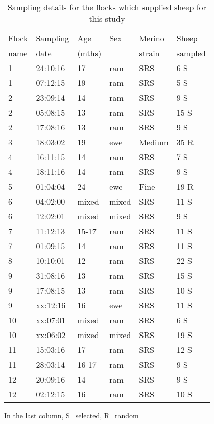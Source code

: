 %

\begin{table}[htp]
\centering
\caption{Sampling details for the flocks which supplied sheep for this study}
\label{tab:flocks}
\vspace{0.1in}
\begin{tabular}{|p{0.6in}|p{0.8in}|p{0.6in}|p{0.6in}|p{0.7in}|p{0.8in}|}  \hline
  Flock  & Sampling  & Age  & Sex & Merino  & Sheep   \\  
  name   & date      & (mths) &   & strain  & sampled\footnotemark \\ \hline
 1 & 24:10:16 & 17 & ram & SRS & 6 S \\
 1 & 07:12:15 & 19 & ram & SRS & 5 S \\
 2 & 23:09:14 & 14 & ram & SRS & 9 S \\
 2 & 05:08:15 & 13 & ram & SRS & 15 S \\
 2 & 17:08:16 & 13 & ram & SRS & 9 S \\
 3 & 18:03:02 & 19 & ewe & Medium  & 35 R \\
 4 & 16:11:15 & 14 & ram & SRS & 7 S \\
 4 & 18:11:16 & 14 & ram & SRS & 9 S \\
 5 & 01:04:04 & 24 & ewe & Fine & 19 R \\
 6 & 04:02:00 & mixed & mixed & SRS & 11 S \\
 6 & 12:02:01 & mixed & mixed & SRS & 9 S \\
 7 & 11:12:13 & 15-17 & ram & SRS & 11 S \\
 7 & 01:09:15 & 14 & ram & SRS & 11 S \\
 8 & 10:10:01 & 12 & ram & SRS & 22 S \\
 9 & 31:08:16 & 13 & ram & SRS & 15 S \\
 9 & 17:08:15 & 13 & ram & SRS & 10 S \\
 9 & xx:12:16 & 16 & ewe & SRS & 11 S \\
10 & xx:07:01 & mixed & ram & SRS & 6 S \\
10 & xx:06:02 & mixed & mixed & SRS & 19 S \\
11 & 15:03:16 & 17 & ram & SRS & 12 S \\
11 & 28:03:14 & 16-17 & ram & SRS & 9 S \\
12 & 20:09:16 & 14 & ram & SRS & 9 S \\
12 & 02:12:15 & 16 & ram & SRS & 10 S \\ \hline
\end{tabular}
\begin{tablenotes}
\small
\item \footnotemark[1] In the last column, S=selected, R=random
\end{tablenotes}
\end{table}


%
